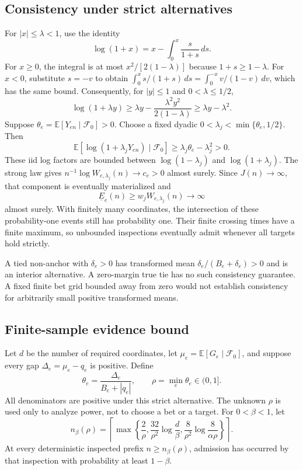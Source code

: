 \documentclass[11pt]{article}
\newcommand{\E}{\mathbb E}
\newcommand{\F}{\mathcal F}
\begin{document}
\subsection{Consistency under strict alternatives}
For $|x|\le\lambda<1$, use the identity
\begin{equation}
 \log(1+x)=x-\int_0^x\frac{s}{1+s}\,ds.
\end{equation}
For $x\ge0$, the integral is at most $x^2/[2(1-\lambda)]$ because $1+s\ge1-\lambda$. For $x<0$, substitute $s=-v$ to obtain $\int_0^x s/(1+s)\,ds=\int_0^{-x}v/(1-v)\,dv$, which has the same bound. Consequently, for $|y|\le1$ and $0<\lambda\le1/2$,
\begin{equation}
 \log(1+\lambda y)\ge\lambda y-\frac{\lambda^2y^2}{2(1-\lambda)}\ge\lambda y-\lambda^2.
 \label{eq:log-lower}
\end{equation}
Suppose $\theta_e=\E[Y_{en}\mid\F_0]>0$. Choose a fixed dyadic $0<\lambda_j<\min\{\theta_e,1/2\}$. Then
\begin{equation}
 \E[\log(1+\lambda_jY_{en})\mid\F_0]\ge\lambda_j\theta_e-\lambda_j^2>0.
\end{equation}
These iid log factors are bounded between $\log(1-\lambda_j)$ and $\log(1+\lambda_j)$. The strong law gives $n^{-1}\log W_{e,\lambda_j}(n)\to c_e>0$ almost surely. Since $J(n)\to\infty$, that component is eventually materialized and
\begin{equation}
 \underline E_e(n)\ge w_jW_{e,\lambda_j}(n)\longrightarrow\infty
\end{equation}
almost surely. With finitely many coordinates, the intersection of these probability-one events still has probability one. Their finite crossing times have a finite maximum, so unbounded inspections eventually admit whenever all targets hold strictly.

A tied non-anchor with $\delta_e>0$ has transformed mean $\delta_e/(B_e+\delta_e)>0$ and is an interior alternative. A zero-margin true tie has no such consistency guarantee. A fixed finite bet grid bounded away from zero would not establish consistency for arbitrarily small positive transformed means.

\subsection{Finite-sample evidence bound}
Let $d$ be the number of required coordinates, let $\mu_e=\E[G_e\mid\F_0]$, and suppose every gap $\Delta_e=\mu_e-q_e$ is positive. Define
\begin{equation}
 \theta_e=\frac{\Delta_e}{B_e+|q_e|},\qquad \rho=\min_e\theta_e\in(0,1].
\end{equation}
All denominators are positive under this strict alternative. The unknown $\rho$ is used only to analyze power, not to choose a bet or a target. For $0<\beta<1$, let
\begin{equation}
 n_\beta(\rho)=\left\lceil\max\left\{\frac2\rho,\frac{32}{\rho^2}\log\frac d\beta,
 \frac8{\rho^2}\log\frac8{\alpha\rho}\right\}\right\rceil.
 \label{eq:power-cap}
\end{equation}
At every deterministic inspected prefix $n\ge n_\beta(\rho)$, admission has occurred by that inspection with probability at least $1-\beta$.
\end{document}
